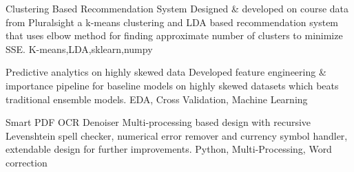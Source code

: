 
\begin{projects}
	\project
	{Clustering Based Recommendation System}{}
	{   }
	{Designed \& developed on course data from Pluralsight a k-means clustering and LDA based recommendation system that uses elbow method for finding approximate number of clusters to minimize SSE.}
	{K-means,LDA,sklearn,numpy}

	\project
	{Predictive analytics on highly skewed data}{}
	{  }
	{Developed feature engineering \& importance pipeline for baseline models on highly skewed datasets which beats traditional ensemble models.}
	{EDA, Cross Validation, Machine Learning}
	
	\project
	{Smart PDF OCR Denoiser}{}
	{  }
	{Multi-processing based design with recursive Levenshtein spell checker, numerical error
remover and currency symbol handler, extendable design for further improvements.}
	{Python, Multi-Processing, Word correction}

\end{projects}